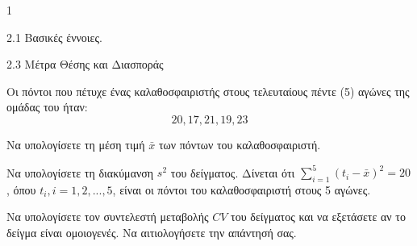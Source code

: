 \begin{ylh}{1}
    \item 2.1 Βασικές έννοιες.
    \item 2.3 Μέτρα Θέσης και Διασποράς
\end{ylh}
Οι πόντοι που πέτυχε ένας καλαθοσφαιριστής στους τελευταίους πέντε (5) αγώνες της ομάδας του ήταν:
\[
    20, 17, 21, 19, 23
\]
\begin{alist}
    \item Να υπολογίσετε τη μέση τιμή $\bar{x}$ των πόντων του καλαθοσφαιριστή. 
    \item Να υπολογίσετε τη διακύμανση $s^2$ του δείγματος. Δίνεται ότι $\sum_{i=1}^{5}(t_i - \bar{x})^2 = 20$, όπου $t_i, i = 1,2,...,5$, είναι οι πόντοι του καλαθοσφαιριστή στους 5 αγώνες. 
    \item Να υπολογίσετε τον συντελεστή μεταβολής $CV$ του δείγματος και να εξετάσετε αν το δείγμα είναι ομοιογενές. Να αιτιολογήσετε την απάντησή σας. 
\end{alist}


